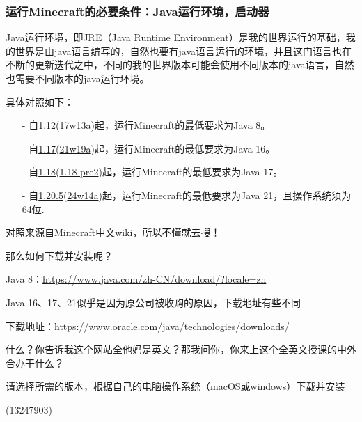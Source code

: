 \documentclass[UTF8,a4paper]{article}
\begin{document}
			\subsubsection{运行Minecraft的必要条件：Java运行环境，启动器}
				\par Java运行环境，即JRE（Java Runtime Environment）是我的世界运行的基础，我的世界是由java语言编写的，自然也要有java语言运行的环境，并且这门语言也在不断的更新迭代之中，不同的我的世界版本可能会使用不同版本的java语言，自然也需要不同版本的java运行环境。
				\par 具体对照如下：
				\begin{itemize}
					\item[-] 自\href{https://zh.minecraft.wiki/w/Java版1.12}{1.12}(\href{https://zh.minecraft.wiki/w/17w13a}{17w13a})起，运行Minecraft的最低要求为Java 8。
					\item[-] 自\href{https://zh.minecraft.wiki/w/Java版1.17}{1.17}(\href{https://zh.minecraft.wiki/w/21w19a}{21w19a})起，运行Minecraft的最低要求为Java 16。
					\item[-] 自\href{https://zh.minecraft.wiki/w/Java版1.18}{1.18}(\href{https://zh.minecraft.wiki/w/Java版1.18-pre2}{1.18-pre2})起，运行Minecraft的最低要求为Java 17。
					\item[-] 自\href{https://zh.minecraft.wiki/w/Java版1.20.5}{1.20.5}(\href{https://zh.minecraft.wiki/w/24w14a}{24w14a})起，运行Minecraft的最低要求为Java 21，且操作系统须为64位.
				\end{itemize}
				\par 对照来源自Minecraft中文wiki，所以不懂就去搜！
				\par 那么如何下载并安装呢？
				\par Java 8：\href{https://www.java.com/zh-CN/download/?locale=zh}{https://www.java.com/zh-CN/download/?locale=zh}
				\par Java 16、17、21似乎是因为原公司被收购的原因，下载地址有些不同
				\par 下载地址：\href{https://www.oracle.com/java/technologies/downloads/}{https://www.oracle.com/java/technologies/downloads/}
				\par 什么？你告诉我这个网站全他妈是英文？那我问你，你来上这个全英文授课的中外合办干什么？
				\par 请选择所需的版本，根据自己的电脑操作系统（macOS或windows）下载并安装
				\begin{flushright}(13247903)\end{flushright}
\end{document}
